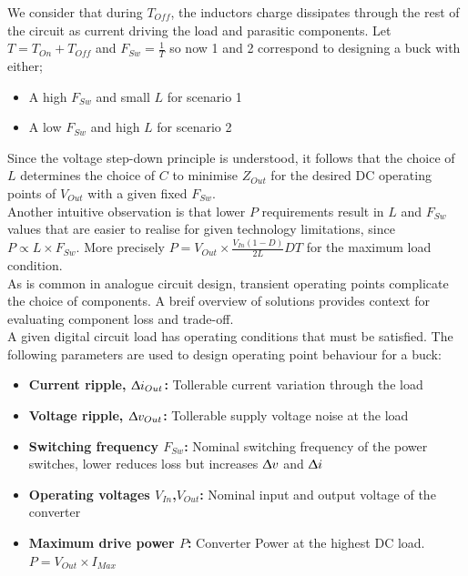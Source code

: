 \documentclass[letterpaper,twocolumn,10pt]{article}
\begin{document}
We consider that during $T_{Off}$, the inductors charge dissipates through the rest of the circuit as current driving the load and parasitic components. Let $T = T_{On}+T_{Off}$ and $F_{Sw} = \frac{1}{T}$ so now 1 and 2 correspond to designing a buck with either;\\
\begin{itemize} %
\item{A high $F_{Sw}$ and small $L$ for scenario 1}
\item{A low $F_{Sw}$ and high $L$ for scenario 2}
\end{itemize}
Since the voltage step-down principle is understood, it follows that the choice of $L$ determines the choice of $C$ to minimise $Z_{Out}$ for the desired DC operating points of $V_{Out}$ with a given fixed $F_{Sw}$.\\
Another intuitive observation is that lower $P$ requirements result in $L$ and $F_{Sw}$ values that are easier to realise for given technology limitations, since $P \propto L\times F_{Sw}$. More precisely $P = V_{Out}\times \frac{V_{In}(1 - D)}{2L}DT$ for the maximum load condition.\\ %
\indent As is common in analogue circuit design, transient operating points complicate the choice of components. A breif overview of solutions provides context for evaluating component loss and trade-off.\\ %
A given digital circuit load has operating conditions that must be satisfied. The following parameters are used to design operating point behaviour for a buck: %
\begin{itemize}
\item {\textbf{Current ripple, $\Updelta i_{Out}$: }Tollerable current variation through the load}
\item {\textbf{Voltage ripple, $\Updelta v_{Out}$: }Tollerable supply voltage noise at the load}
\item {\textbf{Switching frequency $F_{Sw}$: }Nominal switching frequency of the power switches, lower reduces loss but increases $\Updelta v$ and $\Updelta i$}
\item {\textbf{Operating voltages $V_{In}$,$V_{Out}$: }Nominal input and output voltage of the converter}
\item {\textbf{Maximum drive power $P$: }Converter Power at the highest DC load. $P = V_{Out}\times I_{Max}$} 
\end{itemize}   
\end{document}
